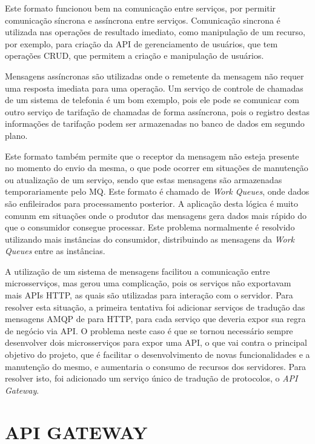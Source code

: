 Este formato funcionou bem na comunicação entre serviços, por permitir comunicação
síncrona e assíncrona entre serviços. Comunicação sincrona é utilizada nas operações
de resultado imediato, como manipulação de um recurso, por exemplo, para criação
da \ac{API} de gerenciamento de usuários, que tem operações \ac{CRUD}, que
permitem a criação e manipulação de usuários.

Mensagens assíncronas são utilizadas onde o remetente da mensagem não requer uma
resposta imediata para uma operação. Um serviço de controle de chamadas de um
sistema de telefonia é um bom exemplo, pois ele pode se comunicar com outro
serviço de tarifação de chamadas de forma assíncrona, pois o registro destas
informações de tarifação podem ser armazenadas no banco de dados em segundo
plano.

Este formato também permite que o receptor da mensagem não esteja
presente no momento do envio da mesma, o que pode ocorrer em situações de
manutenção ou atualização de um serviço, sendo que estas mensagens são
armazenadas temporariamente pelo \ac{MQ}. Este formato é chamado de
\emph{Work Queues}, onde dados são enfileirados para processamento
posterior. A aplicação desta lógica é muito comunm em situações onde o
produtor das mensagens gera dados mais rápido do que o consumidor consegue
processar. Este problema normalmente é resolvido utilizando mais instâncias
do consumidor, distribuindo as mensagens da \emph{Work Queues} entre as
instâncias.

A utilização de um sistema de mensagens facilitou a comunicação entre microsserviços,
mas gerou uma complicação, pois os serviços não exportavam mais \acp{API} \ac{HTTP},
as quais são utilizadas para interação com o servidor. Para resolver esta situação,
a primeira tentativa foi adicionar serviços de tradução das mensagens \ac{AMQP} de
para \ac{HTTP}, para cada serviço que deveria expor sua regra de negócio via \ac{API}.
O problema neste caso é que se tornou necessário sempre desenvolver dois microsserviços
para expor uma \ac{API}, o que vai contra o principal objetivo do projeto, que é facilitar
o desenvolvimento de novas funcionalidades e a manutenção do mesmo, e aumentaria o
consumo de recursos dos servidores. Para resolver isto, foi adicionado um serviço
único de tradução de protocolos, o \emph{API Gateway}.

\section{API GATEWAY}

